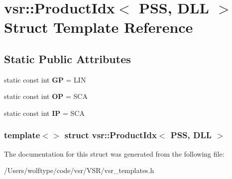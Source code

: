 \hypertarget{structvsr_1_1_product_idx_3_01_p_s_s_00_01_d_l_l_01_4}{\section{vsr\-:\-:Product\-Idx$<$ P\-S\-S, D\-L\-L $>$ Struct Template Reference}
\label{structvsr_1_1_product_idx_3_01_p_s_s_00_01_d_l_l_01_4}
}
\subsection*{Static Public Attributes}
\begin{DoxyCompactItemize}
\item 
\hypertarget{structvsr_1_1_product_idx_3_01_p_s_s_00_01_d_l_l_01_4_ad5a31ba18dbc2f11e5b9be9f89b0f355}{static const int {\bfseries G\-P} = L\-I\-N}\label{structvsr_1_1_product_idx_3_01_p_s_s_00_01_d_l_l_01_4_ad5a31ba18dbc2f11e5b9be9f89b0f355}

\item 
\hypertarget{structvsr_1_1_product_idx_3_01_p_s_s_00_01_d_l_l_01_4_a4a70f915b2e84444e833d22513eff838}{static const int {\bfseries O\-P} = S\-C\-A}\label{structvsr_1_1_product_idx_3_01_p_s_s_00_01_d_l_l_01_4_a4a70f915b2e84444e833d22513eff838}

\item 
\hypertarget{structvsr_1_1_product_idx_3_01_p_s_s_00_01_d_l_l_01_4_a34f04d7531f3c40ca9cec1d04889e226}{static const int {\bfseries I\-P} = S\-C\-A}\label{structvsr_1_1_product_idx_3_01_p_s_s_00_01_d_l_l_01_4_a34f04d7531f3c40ca9cec1d04889e226}

\end{DoxyCompactItemize}
\subsubsection*{template$<$$>$ struct vsr\-::\-Product\-Idx$<$ P\-S\-S, D\-L\-L $>$}



The documentation for this struct was generated from the following file\-:\begin{DoxyCompactItemize}
\item 
/\-Users/wolftype/code/vsr/\-V\-S\-R/vsr\-\_\-templates.\-h\end{DoxyCompactItemize}
